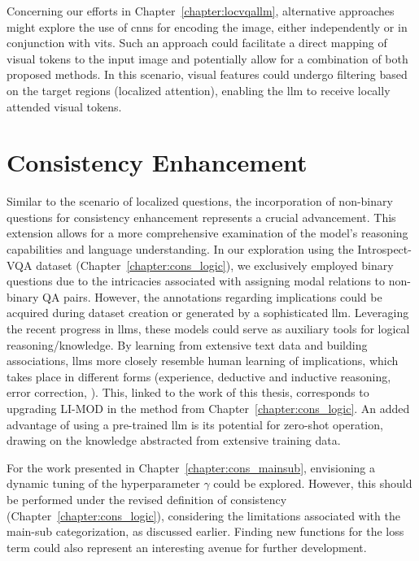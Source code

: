 Concerning our efforts in Chapter~\ref{chapter:locvqallm}, alternative approaches might explore the use of \glspl{cnn} for encoding the image, either independently or in conjunction with \glspl{vit}. Such an approach could facilitate a direct mapping of visual tokens to the input image and potentially allow for a combination of both proposed methods. In this scenario, visual features could undergo filtering based on the target regions (localized attention), enabling the \gls{llm} to receive locally attended visual tokens.

\section{Consistency Enhancement}

Similar to the scenario of localized questions, the incorporation of non-binary questions for consistency enhancement represents a crucial advancement. This extension allows for a more comprehensive examination of the model's reasoning capabilities and language understanding. In our exploration using the Introspect-VQA dataset (Chapter~\ref{chapter:cons_logic}), we exclusively employed binary questions due to the intricacies associated with assigning modal relations to non-binary QA pairs. However, the annotations regarding implications could be acquired during dataset creation or generated by a sophisticated \gls{llm}. Leveraging the recent progress in \glspl{llm}, these models could serve as auxiliary tools for logical reasoning/knowledge. By learning from extensive text data and building associations, \glspl{llm} more closely resemble human learning of implications, which takes place in different forms (experience, deductive and inductive reasoning, error correction, \etc). This, linked to the work of this thesis, corresponds to upgrading LI-MOD in the method from Chapter~\ref{chapter:cons_logic}. An added advantage of using a pre-trained \gls{llm} is its potential for zero-shot operation, drawing on the knowledge abstracted from extensive training data.

For the work presented in Chapter~\ref{chapter:cons_mainsub}, envisioning a dynamic tuning of the hyperparameter $\gamma$ could be explored. However, this should be performed under the revised definition of consistency (Chapter~\ref{chapter:cons_logic}), considering the limitations associated with the main-sub categorization, as discussed earlier. Finding new functions for the loss term could also represent an interesting avenue for further development.

